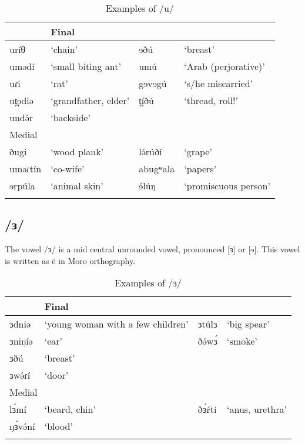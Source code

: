 \begin{table}
\caption{Examples of /u/}
 \label{tab:ch2:4}
\begin{tabular}[t]{lp{4.28cm}lp{4.28cm}}
 \lsptoprule
\multicolumn{2}{l}{Initial} &	\multicolumn{2}{l}{Final}  \\
\midrule
uríθ		&	‘chain’			&	ɘðú	&	‘breast’	\\
umədí	& ‘small biting ant’		& 	umú	 	&‘Arab (perjorative)’\\
uɾi 	&	‘rat’ 			&	gɘvɘgú	&	‘s/he miscarried’\\
ut̪ɘdiə	&	‘grandfather, elder’	&	 t̪íðú	&	‘thread, roll!’\\
undə́r	&	‘backside’		\\
\midrule
 \multicolumn{2}{l}{Medial} & & \\
 \midrule
 ðugi	& ‘wood plank’		&	lə́rúðí	&	‘grape’\\
uməɾtín&	‘co-wife’			&	abugʷala	& ‘papers’\\
ɘrpúla	&‘animal skin’			&	ɘ́lúŋ	&	‘promiscuous person’\\
\lspbottomrule
\end{tabular}
\end{table}


\subsection{/ɜ/}

The vowel /ɜ/ is a mid central unrounded vowel, pronounced [ɜ] or [ɘ]. This vowel is written as ë in Moro orthography. 

\begin{table}
\caption{Examples of /ɜ/}
 \label{tab:ch2:5}
\begin{tabular}[t]{lp{5.5cm}lp{3.85cm}}
 \lsptoprule
\multicolumn{2}{l}{Initial} &	\multicolumn{2}{l}{Final}  \\
\midrule
ɜdniə	&	‘young woman with a few children’	&	ɜtúlɜ	&	‘big spear’ \\
ɜniŋíə	&	‘ear’						&	ðə́wɜ́	&	‘smoke’\\
ɜðú	&	‘breast’		\\
ɜwə́ɾí	&	‘door’		\\
\midrule
 \multicolumn{2}{l}{Medial} & & \\
 \midrule			
lɜ́mí	&	‘beard, chin’	&	ðɜ́ŕtí	&	‘anus, urethra’\\
ŋɜ́və́ní	&	‘blood’		\\
\lspbottomrule
\end{tabular}
\end{table}


